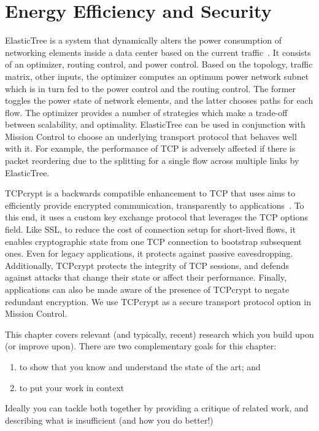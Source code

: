 \documentclass[a4paper,12pt,twoside,openright]{report}
\begin{document}
\section{Energy Efficiency and Security}
ElasticTree is a system that dynamically alters the power consumption of
networking elements inside a data center based on the current
traffic~\cite{Heller:2010:ESE}. It consists of an optimizer, routing control,
and power control. Based on the topology, traffic matrix, other inputs, the
optimizer computes an optimum power network subnet which is in turn fed to the
power control and the routing control. The former toggles the power state of
network elements, and the latter chooses paths for each flow. The optimizer
provides a number of strategies which make a trade-off between scalability, and
optimality. ElasticTree can be used in conjunction with Mission Control to
choose an underlying transport protocol that behaves well with it. For example,
the performance of TCP is adversely affected if there is packet reordering due
to the splitting for a single flow across multiple links by ElasticTree.

TCPcrypt is a backwards compatible enhancement to TCP that uses aims to
efficiently provide encrypted communication, transparently to
applications~\cite{bittau:the}. To this end, it uses a custom key exchange
protocol that leverages the TCP options field. Like SSL, to reduce the cost of
connection setup for short-lived flows, it enables cryptographic state from one
TCP connection to bootstrap subsequent ones. Even for legacy applications, it
protects against passive eavesdropping. Additionally, TCPcrypt protects the
integrity of TCP sessions, and defends against attacks that change their state
or affect their performance. Finally, applications can also be made aware of the
presence of TCPcrypt to negate redundant encryption. We use TCPcrypt as a secure
transport protocol option in Mission Control.

This chapter covers relevant (and typically, recent) research 
which you build upon (or improve upon). There are two complementary 
goals for this chapter: 
\begin{enumerate} 
  \item to show that you know and understand the state of the art; and 
  \item to put your work in context
\end{enumerate} 

Ideally you can tackle both together by providing a critique of
related work, and describing what is insufficient (and how you do
better!)
\end{document}
